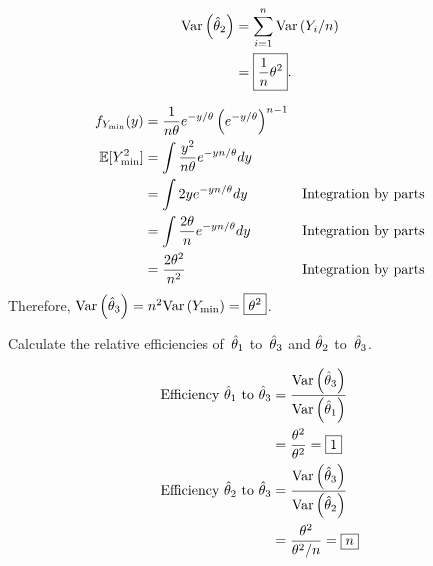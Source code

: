 \begin{align}
  \text{Var}\left(\hat{\theta}_{2}\right) &= \sum_{i=1}^{n} \text{Var}\left(Y_i /n\right) \\
                  &= \boxed{\frac{1}{n}\theta^{2}}\text{.}
\end{align}

\begin{align}
  f_{Y_{\min}}(y) &= \frac{1}{n\theta}e^{-y/\theta}\left(e^{-y/\theta}\right)^{n-1} \\
  \mathbb{E}\lbrack Y_{\min}^2\rbrack &= \int \frac{y^2}{n\theta} e^{-yn/\theta} dy \\
                    &= \int 2y e^{-yn/\theta} dy & \text{Integration by parts} \\
                    &= \int \frac{2\theta}{n} e^{-yn/\theta} dy & \text{Integration by parts} \\
                    &=  \frac{2\theta^{2}}{n^{2}} & \text{Integration by parts}
\end{align}
Therefore, ${\text{Var}\left(\hat{\theta}_{3}\right) = n^2 \text{Var}\left(Y_{\min}\right) = \boxed{\theta^2}}$.

\begin{subproblem}
  Calculate the relative efficiencies of~$\hat{\theta}_{1}$ to~$\hat{\theta}_{3}$ and $\hat{\theta}_{2}$ to~$\hat{\theta}_{3}$.
\end{subproblem}

\begin{align}
  \text{Efficiency }\hat{\theta}_{1} \text{ to }\hat{\theta}_{3} &= \frac{\text{Var}\left(\hat{\theta}_{3}\right)}{\text{Var}\left(\hat{\theta}_{1}\right)} \\
                                                   &= \frac{\theta^2}{\theta^2} = \boxed{1} \\
  \text{Efficiency }\hat{\theta}_{2} \text{ to }\hat{\theta}_{3} &= \frac{\text{Var}\left(\hat{\theta}_{3}\right)}{\text{Var}\left(\hat{\theta}_{2}\right)} \\
                                                   &= \frac{\theta^2}{\theta^2 /n} = \boxed{n}
\end{align}
